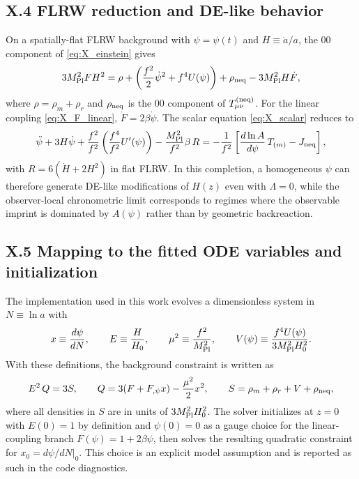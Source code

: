 \documentclass[10pt]{article}
\begin{document}
\subsection{X.4 FLRW reduction and DE-like behavior}

On a spatially-flat FLRW background with $\psi=\psi(t)$ and $H\equiv\dot a/a$, the $00$ component of
\eqref{eq:X_einstein} gives
\begin{equation}
3M_{\rm Pl}^{2}F H^{2}
=
\rho
+
\left(\frac{f^{2}}{2}\dot\psi^{2}+f^{4}U(\psi)\right)
+\rho_{\rm neq}
-3M_{\rm Pl}^{2}H\dot F,
\label{eq:X_friedmann}
\end{equation}
where $\rho=\rho_m+\rho_r$ and $\rho_{\rm neq}$ is the $00$ component of $T^{(\rm neq)}_{\mu\nu}$.
For the linear coupling \eqref{eq:X_F_linear}, $\dot F=2\beta\dot\psi$.
The scalar equation \eqref{eq:X_scalar} reduces to
\begin{equation}
\ddot\psi+3H\dot\psi
+\frac{f^{2}}{f^{2}}\left(\frac{f^{4}}{f^{2}}U'(\psi)\right)
-\frac{M_{\rm Pl}^{2}}{f^{2}}\beta\,R
=
-\frac{1}{f^{2}}\left[\frac{d\ln A}{d\psi}\,T_{(m)}-J_{\rm neq}\right],
\label{eq:X_psi_FLRW}
\end{equation}
with $R=6(\dot H+2H^{2})$ in flat FLRW.
In this completion, a homogeneous $\psi$ can therefore generate DE-like modifications of $H(z)$
even with $\Lambda=0$, while the observer-local chronometric limit corresponds to regimes where the
observable imprint is dominated by $A(\psi)$ rather than by geometric backreaction.

\subsection{X.5 Mapping to the fitted ODE variables and initialization}
\label{sec:appendixX_mapping}

The implementation used in this work evolves a dimensionless system in
$N\equiv\ln a$ with
\begin{equation}
x \equiv \frac{d\psi}{dN},
\qquad
E \equiv \frac{H}{H_0},
\qquad
\mu^2 \equiv \frac{f^2}{M_{\rm Pl}^2},
\qquad
V(\psi) \equiv \frac{f^4 U(\psi)}{3M_{\rm Pl}^2 H_0^2}.
\end{equation}
With these definitions, the background constraint is written as
\begin{equation}
E^2\,Q = 3S,
\qquad
Q = 3\!\left(F+F_{,\psi}x\right)-\frac{\mu^2}{2}x^2,
\qquad
S = \rho_m+\rho_r+V+\rho_{\rm neq},
\end{equation}
where all densities in $S$ are in units of $3M_{\rm Pl}^2H_0^2$.
The solver initializes at $z=0$ with
$E(0)=1$ by definition and $\psi(0)=0$ as a gauge choice for the linear-coupling branch
$F(\psi)=1+2\beta\psi$, then solves the resulting quadratic constraint for $x_0=d\psi/dN|_{0}$.
This choice is an explicit model assumption and is reported as such in the code diagnostics.
\end{document}
